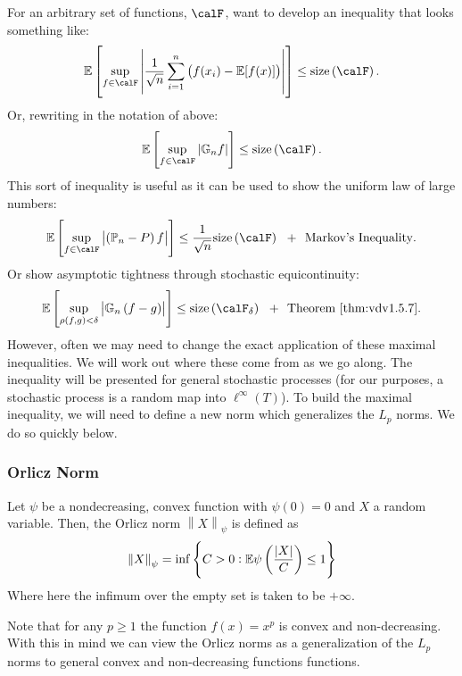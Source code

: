 For an arbitrary set of functions, \(\calF\), want to develop an inequality that looks something like:
\[
	\E\left[\sup_{f\in\calF}\left|\frac{1}{\sqrt{n}}\sum_{i=1}^n \left(f(x_i)-\E[f(x)]\right) \right|\right]\leq \text{size}\left(\calF\right)
.\]
Or, rewriting in the notation of above:
\[
	\E\left[\sup_{f\in\calF}\left|\mathbb{G}_nf\right|\right]\leq \text{size}\left(\calF\right)
.\] 
This sort of inequality is useful as it can be used to show the uniform law of large numbers:
\[
	\E\left[\sup_{f\in\calF}\left|\left(\P_n - P\right)f\right|\right] \leq \frac{1}{\sqrt{n}}\text{size}\left(\calF\right)\hbox{  }\text{ + }\hbox{  }\text{Markov's Inequality}
.\] 
Or show asymptotic tightness through stochastic equicontinuity:
\[
	\E\left[\sup_{\rho(f,g)<\delta}\left|\mathbb{G}_n\left(f-g\right)\right|\right] \leq \text{size}\left(\calF_\delta\right)\hbox{  }\text{ + }\hbox{  }\text{Theorem~\ref{thm:vdv1.5.7}}
.\]
However, often we may need to change the exact application of these maximal inequalities. We will work out where these come from as we go along. The inequality will be presented for general stochastic processes (for our purposes, a stochastic process is a random map into \(\ell^\infty(T)\)). To build the maximal inequality, we will need to define a new norm which generalizes the \(L_p\) norms. We do so quickly below.

\subsubsection{Orlicz Norm}

\begin{definition}
	\label{def:orlicz}
	Let \(\psi\) be a nondecreasing, convex function with  \(\psi(0)=0\) and  \(X\) a random variable. Then, the Orlicz norm  \(\left\|X\right\|_\psi\) is defined as 
	\begin{equation}
		\label{eq:orlicz}
		\left\|X\right\|_\psi = \inf\left\{C > 0 : \mathbb{E}\psi\left(\frac{|X|}{C} \right)\leq 1\right\}
	\end{equation}
	Where here the infimum over the empty set is taken to be \(+\infty\).
\end{definition}
\begin{remark}
    \label{rem:ell-orlicz}
	Note that for any \(p\geq 1\) the function \(f(x) = x^p\) is convex and non-decreasing. With this in mind we can view the Orlicz norms as a generalization of the \(L_p\) norms to general convex and non-decreasing functions functions.
\end{remark}

